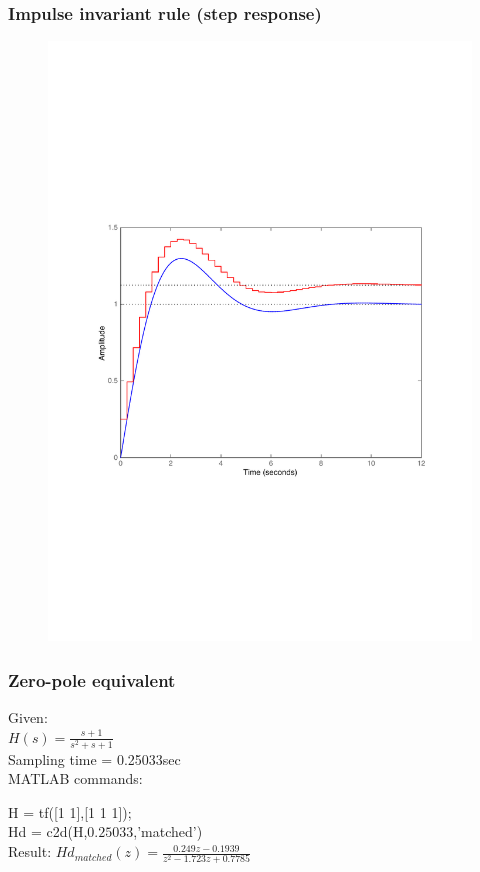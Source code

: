\begin{frame}
	\frametitle{Impulse invariant rule (step response)}
	\vspace{-0.7em}
	\begin{figure}
		\centering
		\includegraphics[width=0.8\linewidth]{vb3}
	\end{figure}
\end{frame}

\begin{frame}
	\frametitle{Zero-pole equivalent}
	\begin{example}
		Given:\\
		$H(s) = \frac{s + 1}{s^{2} + s + 1}$\\
		Sampling time = 0.25033sec\\
		\vspace{1em}
		MATLAB commands:
		
		H = tf([1 1],[1 1 1]); \\
		Hd = c2d(H,$0.25033$,'matched')\\
		\vspace{1em}
		Result: 
		$Hd_{matched}(z) = \frac{0.249z - 0.1939}{z^{2} - 1.723z + 0.7785}$
	\end{example}
\end{frame}

